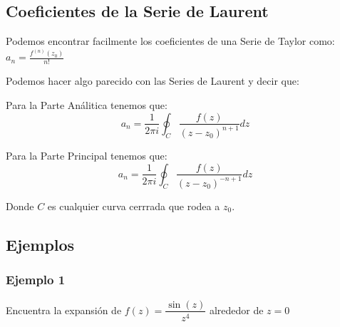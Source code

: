 \documentclass[12pt, fleqn]{report}                             %
\theoremstyle{break}                                            %
\newcommand{\Wrap}[1]           {\left( #1 \right)}             %
\newcommand{\Sin}[1] {\sin\Wrap{#1}}                            %
\begin{document}
            \subsection{Coeficientes de la Serie de Laurent}

                Podemos encontrar facilmente los coeficientes de una Serie de Taylor como:\\
                $a_n = \frac{f^{(n)}(z_0)}{n!}$

                Podemos hacer algo parecido con las Series de Laurent y decir que:

                Para la Parte Análitica tenemos que:
                \begin{equation*}
                    a_n = \dfrac{1}{2 \pi i} \oint_C \dfrac{f(z)}{(z - z_0)^{n+1}} dz
                \end{equation*}

                Para la Parte Principal tenemos que:
                \begin{equation*}
                    a_n = \dfrac{1}{2 \pi i} \oint_C \dfrac{f(z)}{(z - z_0)^{-n+1}} dz
                \end{equation*}


                Donde $C$ es cualquier curva cerrrada que rodea a $z_0$.





            \clearpage
            \subsection{Ejemplos}


                \subsubsection{Ejemplo 1}

                    Encuentra la expansión de $f(z) = \dfrac{\Sin{z}}{z^4}$ alrededor
                    de $z = 0$
\end{document}
